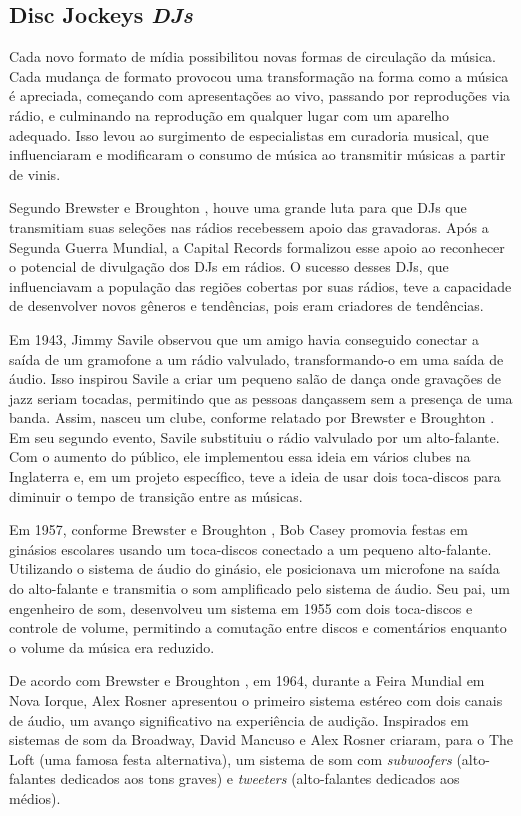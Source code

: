 \subsection{Disc Jockeys \textit{DJs}}

Cada novo formato de mídia possibilitou novas formas de circulação da música. Cada mudança de formato provocou uma transformação na forma como a música é apreciada, começando com apresentações ao vivo, passando por reproduções via rádio, e culminando na reprodução em qualquer lugar com um aparelho adequado. Isso levou ao surgimento de especialistas em curadoria musical, que influenciaram e modificaram o consumo de música ao transmitir músicas a partir de vinis.

Segundo Brewster e Broughton \cite{lastnight}, houve uma grande luta para que DJs que transmitiam suas seleções nas rádios recebessem apoio das gravadoras. Após a Segunda Guerra Mundial, a Capital Records formalizou esse apoio ao reconhecer o potencial de divulgação dos DJs em rádios. O sucesso desses DJs, que influenciavam a população das regiões cobertas por suas rádios, teve a capacidade de desenvolver novos gêneros e tendências, pois eram criadores de tendências.

Em 1943, Jimmy Savile observou que um amigo havia conseguido conectar a saída de um gramofone a um rádio valvulado, transformando-o em uma saída de áudio. Isso inspirou Savile a criar um pequeno salão de dança onde gravações de jazz seriam tocadas, permitindo que as pessoas dançassem sem a presença de uma banda. Assim, nasceu um clube, conforme relatado por Brewster e Broughton \cite{lastnight}. Em seu segundo evento, Savile substituiu o rádio valvulado por um alto-falante. Com o aumento do público, ele implementou essa ideia em vários clubes na Inglaterra e, em um projeto específico, teve a ideia de usar dois toca-discos para diminuir o tempo de transição entre as músicas.

Em 1957, conforme Brewster e Broughton \cite{lastnight}, Bob Casey promovia festas em ginásios escolares usando um toca-discos conectado a um pequeno alto-falante. Utilizando o sistema de áudio do ginásio, ele posicionava um microfone na saída do alto-falante e transmitia o som amplificado pelo sistema de áudio. Seu pai, um engenheiro de som, desenvolveu um sistema em 1955 com dois toca-discos e controle de volume, permitindo a comutação entre discos e comentários enquanto o volume da música era reduzido.

De acordo com Brewster e Broughton \cite{lastnight}, em 1964, durante a Feira Mundial em Nova Iorque, Alex Rosner apresentou o primeiro sistema estéreo com dois canais de áudio, um avanço significativo na experiência de audição. Inspirados em sistemas de som da Broadway, David Mancuso e Alex Rosner criaram, para o The Loft (uma famosa festa alternativa), um sistema de som com \textit{subwoofers} (alto-falantes dedicados aos tons graves) e \textit{tweeters} (alto-falantes dedicados aos médios).

